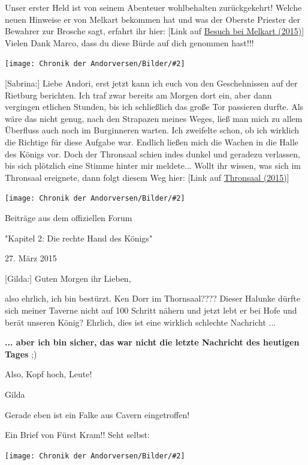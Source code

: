 \documentclass[10pt, a4paper, oneside]{book}
\newcommand{\refstorytext}[1]{\hyperref[Storytext: #1]{#1}}
\newcommand{\bildmitts}[2][height=0.32\textwidth,width=0.48\textwidth,keepaspectratio]{%
    \begin{center}
        \texttt{[image: Chronik der Andorversen/Bilder/\#2]}
    \end{center}
}
\begin{document}
\begin{multicols}{2}
Unser erster Held ist von seinem Abenteuer wohlbehalten zurückgekehrt! Welche neuen Hinweise er von Melkart bekommen hat und was der Oberste Priester der Bewahrer zur Brosche sagt, erfahrt ihr hier: [Link auf \refstorytext{Besuch bei Melkart (2015)}] Vielen Dank Marco, dass du diese Bürde auf dich genommen hast!!! 

\bildmitts{AA2015 Die rechte Hand des Königs 4.jpeg}

[Sabrina:] Liebe Andori, erst jetzt kann ich euch von den Geschehnissen auf der Rietburg berichten. Ich traf zwar bereits am Morgen dort ein, aber dann vergingen etlichen Stunden, bis ich schließlich das große Tor passieren durfte. Als wäre das nicht genug, nach den Strapazen meines Weges, ließ man mich zu allem Überfluss auch noch im Burginneren warten. Ich zweifelte schon, ob ich wirklich die Richtige für diese Aufgabe war. Endlich ließen mich die Wachen in die Halle des Königs vor. Doch der Thronsaal schien indes dunkel und geradezu verlassen, bis sich plötzlich eine Stimme hinter mir meldete... Wollt ihr wissen, was sich im Thronsaal ereignete, dann folgt diesem Weg hier: [Link auf \refstorytext{Thronsaal (2015)}]

\bildmitts{AA2015 Die rechte Hand des Königs 5.jpeg}








\begin{center}
    Beiträge aus dem offiziellen Forum

    "Kapitel 2: Die rechte Hand des Königs"

    27. März 2015
\end{center}

[Gilda:] Guten Morgen ihr Lieben,

also ehrlich, ich bin bestürzt. Ken Dorr im Thornsaal???? Dieser Halunke dürfte sich meiner Taverne nicht auf 100 Schritt nähern und jetzt lebt er bei Hofe und berät unseren König? Ehrlich, dies ist eine wirklich schlechte Nachricht ...

\textbf{... aber ich bin sicher, das war nicht die letzte Nachricht des heutigen Tages} ;)

Also, Kopf hoch, Leute!

Gilda

Gerade eben ist ein Falke aus Cavern eingetroffen!

Ein Brief von Fürst Kram!! Seht selbst:

\bildmitts{AA2015 Krams Brief.jpeg}


\end{multicols}
\end{document}

